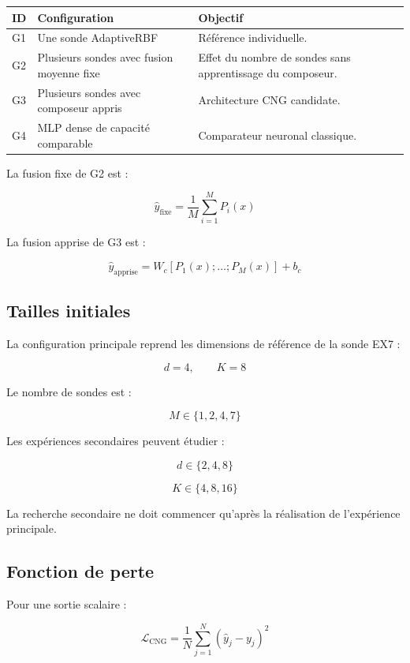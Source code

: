 \documentclass[11pt,a4paper]{article}
\newcommand{\Loss}{\mathcal{L}}
\begin{document}
\begin{tabularx}{\textwidth}{
    >{\centering\arraybackslash}p{}
    >{\RaggedRight\arraybackslash}p{}
    X
}
\toprule
\textbf{ID} & \textbf{Configuration} & \textbf{Objectif} \\
\midrule
G1
& Une sonde AdaptiveRBF
& Référence individuelle. \\

G2
& Plusieurs sondes avec fusion moyenne fixe
& Effet du nombre de sondes sans apprentissage du composeur. \\

G3
& Plusieurs sondes avec composeur appris
& Architecture CNG candidate. \\

G4
& MLP dense de capacité comparable
& Comparateur neuronal classique. \\
\bottomrule
\end{tabularx}

La fusion fixe de G2 est :

\[
\widehat y_{\mathrm{fixe}}
=
\frac{1}{M}
\sum_{i=1}^{M}P_i(x)
\]

La fusion apprise de G3 est :

\[
\widehat y_{\mathrm{apprise}}
=
W_c[P_1(x);\ldots;P_M(x)]+b_c
\]

\subsection{Tailles initiales}

La configuration principale reprend les dimensions
de référence de la sonde EX7 :

\[
d=4,\qquad K=8
\]

Le nombre de sondes est :

\[
M\in\{1,2,4,7\}
\]

Les expériences secondaires peuvent étudier :

\[
d\in\{2,4,8\}
\]

\[
K\in\{4,8,16\}
\]

La recherche secondaire ne doit commencer qu'après
la réalisation de l'expérience principale.

\subsection{Fonction de perte}

Pour une sortie scalaire :

\[
\Loss_{\mathrm{CNG}}
=
\frac{1}{N}
\sum_{j=1}^{N}
\left(
\widehat y_j-y_j
\right)^2
\]
\end{document}
